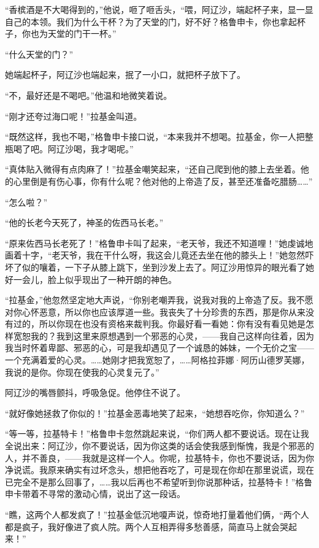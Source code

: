 \par “香槟酒是不大喝得到的，”他说，咂了咂舌头，“喂，阿辽沙，端起杯子来，显一显自己的本领。我们为什么干杯？为了天堂的门，好不好？格鲁申卡，你也拿起杯子，你也为天堂的门干一杯。”
\par “什么天堂的门？”
\par 她端起杯子，阿辽沙也端起来，抿了一小口，就把杯子放下了。
\par “不，最好还是不喝吧。”他温和地微笑着说。
\par “刚才还夸过海口呢！”拉基金叫道。
\par “既然这样，我也不喝，”格鲁申卡接口说，“本来我并不想喝。拉基金，你一人把整瓶喝了吧。阿辽沙喝，我才喝呢。”
\par “真体贴入微得有点肉麻了！”拉基金嘲笑起来，“还自己爬到他的膝上去坐着。他的心里倒是有伤心事，你有什么呢？他对他的上帝造了反，甚至还准备吃腊肠……”
\par “怎么啦？”
\par “他的长老今天死了，神圣的佐西马长老。”
\par “原来佐西马长老死了！”格鲁申卡叫了起来，“老天爷，我还不知道哩！”她虔诚地画着十字，“老天爷，我在干什么呀，我这会儿竟还去坐在他的膝头上！”她忽然吓坏了似的嚷着，一下子从膝上跳下，坐到沙发上去了。阿辽沙用惊异的眼光看了她好一会儿，脸上似乎现出了一种开朗的神色。
\par “拉基金，”他忽然坚定地大声说，“你别老嘲弄我，说我对我的上帝造了反。我不愿对你心怀恶意，所以你也应该厚道一些。我丧失了十分珍贵的东西，那是你从来没有过的，所以你现在也没有资格来裁判我。你最好看一看她：你有没有看见她是怎样宽恕我的？我到这里来原想遇到一个邪恶的心灵，——我自己这样向往着，因为我当时怀着卑鄙、邪恶的心，可是我却遇见了一个诚恳的姊妹，一个无价之宝——一个充满着爱的心灵。……她刚才把我宽恕了，……阿格拉菲娜·阿历山德罗芙娜，我说的是你。你现在使我的心灵复元了。”
\par 阿辽沙的嘴唇颤抖，呼吸急促。他停住不说了。
\par “就好像她拯救了你似的！”拉基金恶毒地笑了起来，“她想吞吃你，你知道么？”
\par “等一等，拉基特卡！”格鲁申卡忽然跳起来说，“你们两人都不要说话。现在让我全说出来：阿辽沙，你不要说话，因为你这类的话会使我感到惭愧，我是个邪恶的人，并不善良，——我就是这样一个人。你呢，拉基特卡，你也不要说话，因为你净说谎。我原来确实有过坏念头，想把他吞吃了，可是现在你却在那里说谎，现在已完全不是那么回事了，……我以后再也不希望听到你说那种话，拉基特卡！”格鲁申卡带着不寻常的激动心情，说出了这一段话。
\par “瞧，这两个人都发疯了！”拉基金低沉地嗄声说，惊奇地打量着他们俩，“两个人都是疯子，我好像进了疯人院。两个人互相弄得多愁善感，简直马上就会哭起来！”
